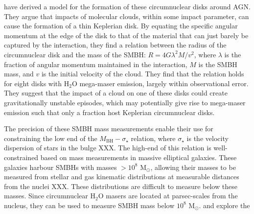 \citet{wardle2012_bhmass} have derived a model for the formation of these circumnuclear disks around AGN. They argue that impacts of molecular clouds, within some impact parameter, can cause the formation of a thin Keplerian disk. By equating the specific angular momentum at the edge of the disk to that of the material that can just barely be captured by the interaction, they find a relation between the radius of the circumnuclear disk and the mass of the SMBH: $R=4G\lambda^2M/v^2$, where $\lambda$ is the fraction of angular momentum maintained in the interaction, $M$ is the SMBH mass, and $v$ is the initial velocity of the cloud. They find that the relation holds for eight disks with H$_2$O mega-maser emission, largely within observational error. They suggest that the impact of a cloud on one of these disks could create gravitationally unstable episodes, which may potentially give rise to mega-maser emission \citep{Milosavljevi_2004} such that only a fraction host Keplerian circumnuclear disks.

The precision of these SMBH mass measurements enable their use for constraining the low end of the $M_{\mathrm{BH}}-\sigma_{\star}$ relation, where $\sigma_{\star}$ is the velocity dispersion of stars in the bulge XXX. The high-end of this relation is well-constrained based on mass measurements in massive elliptical galaxies. These galaxies harbour SMBHs with masses $\gt 10^8$ M$_{\odot}$, allowing their masses to be measured from stellar and gas kinematic distributions at measurable distances from the nuclei XXX. These distributions are difficult to measure below these masses. Since circumnuclear H$_2$O masers are located at parsec-scales from the nucleus, they can be used to measure SMBH mass below $10^8$ M$_{\odot}$. \citet{greene2010_bhmass} and \citet{Pesce_2015} explore the 

